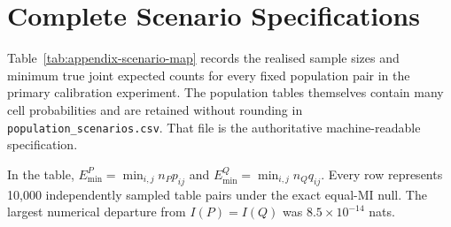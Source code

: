\chapter{Complete Scenario Specifications}
\label{app:scenario-specifications}

Table~\ref{tab:appendix-scenario-map} records the realised sample sizes and
minimum true joint expected counts for every fixed population pair in the
primary calibration experiment. The population tables themselves contain
many cell probabilities and are retained without rounding in
\texttt{population\_scenarios.csv}. That file is the authoritative
machine-readable specification.

In the table, $E_{\min}^{P}=\min_{i,j}n_Pp_{ij}$ and
$E_{\min}^{Q}=\min_{i,j}n_Qq_{ij}$. Every row represents 10,000 independently
sampled table pairs under the exact equal-MI null. The largest numerical
departure from $I(P)=I(Q)$ was $8.5\times10^{-14}$ nats.

